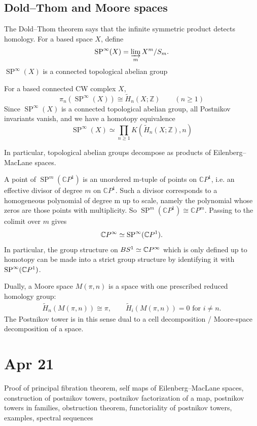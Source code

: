 \documentclass[12pt]{article}
\begin{document}
\subsection{Dold--Thom and Moore spaces}
The Dold--Thom theorem says that the infinite symmetric product detects homology. For a based space $X$, define
\begin{align*}
    \operatorname{SP}^\infty(X)
    = \varinjlim_m X^m/S_m.
\end{align*} $\operatorname{SP}^\infty(X)$ is a connected topological abelian group
\begin{theorem}
For a based connected CW complex $X$,
\[\pi_n(\operatorname{SP}^\infty(X)) \cong \widetilde H_n(X;\mathbb Z)
\qquad (n\ge 1)\]
Since $\operatorname{SP}^\infty(X)$ is a connected topological abelian group, all Postnikov invariants vanish, and we have a homotopy equivalence \[
\operatorname{SP}^\infty(X)\simeq \prod_{n\ge 1} K(\widetilde H_n(X;\mathbb Z),n)
\]
\end{theorem}
In particular, topological abelian groups decompose as products of Eilenberg--MacLane spaces. 

\begin{example}
A point of $\operatorname{SP}^m(\mathbb CP^1)$ is an unordered m-tuple of points on $\mathbb CP^1$, i.e. an effective divisor of degree $m$ on $\mathbb CP^1$. Such a divisor corresponds to a homogeneous polynomial of degree m up to scale, namely the polynomial whose zeros are those points with multiplicity. So
$\operatorname{SP}^m(\mathbb CP^1)\cong \mathbb CP^m$.
Passing to the colimit over $m$ gives
\begin{align*}
    \mathbb{C} P^\infty \simeq \operatorname{SP}^\infty(\mathbb{C} P^1).
\end{align*}
In particular, the group structure on $BS^1 \simeq
\mathbb{C} P^\infty$ which is only defined up to homotopy can be made into a strict group structure by identifying it with $\operatorname{SP}^\infty(\mathbb{C} P^1)$.
\end{example}

Dually, a Moore space $M(\pi,n)$ is a space with one prescribed reduced homology group:
\begin{align*}
    \widetilde H_n(M(\pi,n)) \cong \pi,
    \qquad
    \widetilde H_i(M(\pi,n)) = 0 \text{ for } i\neq n.
\end{align*}
The Postnikov tower is in this sense dual to a cell decomposition / Moore-space decomposition of a space.

\section{Apr 21}
Proof of principal fibration theorem, self maps of Eilenberg--MacLane spaces, construction of postnikov towers, postnikov factorization of a map, postnikov towers in families, obstruction theorem, functoriality of postnikov towers, examples, spectral sequences
\end{document}
